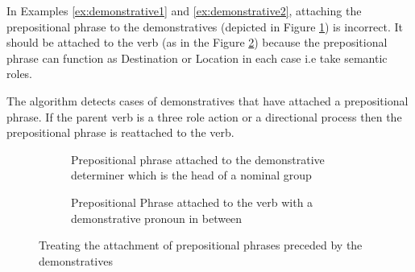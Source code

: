     In Examples \ref{ex:demonstrative1} and \ref{ex:demonstrative2}, attaching the prepositional phrase to the demonstratives (depicted in Figure \ref{fig:demonstrative-init}) is incorrect. It should be attached to the verb (as in the Figure \ref{fig:demonstrative-final}) because the prepositional phrase can function as Destination or Location in each case i.e take semantic roles. 

    The algorithm detects cases of demonstratives that have attached a prepositional phrase. If the parent verb is a three role action or a directional process then the prepositional phrase is reattached to the verb.

    \begin{figure}[!ht]
        \centering
        \begin{subfigure}[t]{0.45\linewidth}
        \centering
        \caption{Prepositional phrase attached to the demonstrative determiner which is the head of a nominal group}
        \label{fig:demonstrative-init}
        \end{subfigure}
        \quad
        \begin{subfigure}[t]{0.45\linewidth}
        \centering
        	\caption{Prepositional Phrase attached to the verb with a demonstrative pronoun in between}
        	\label{fig:demonstrative-final}
        \end{subfigure}
        \caption{Treating the attachment of prepositional phrases preceded by the demonstratives}
        \label{fig:demonstrative-final-final}
    \end{figure}

